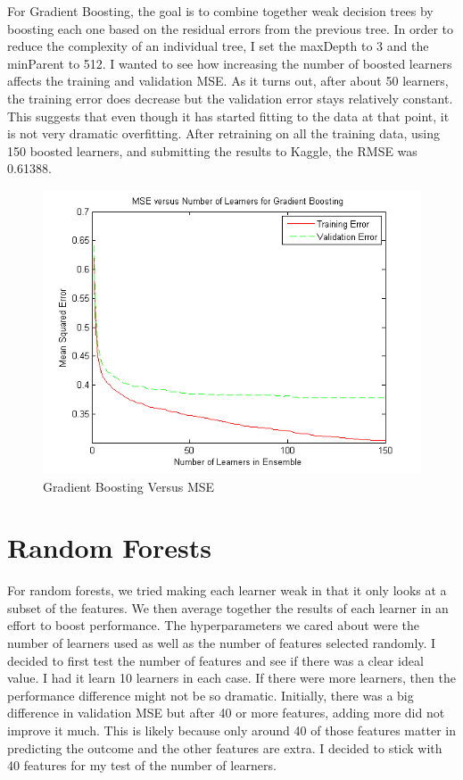\documentclass[twoside,11pt]{article}
\theoremstyle{definition}
\begin{document}
For Gradient Boosting, the goal is to combine together weak decision trees by boosting each one based on the residual errors from the previous tree. In order to reduce the complexity of an individual tree, I set the maxDepth to 3 and the minParent to 512. I wanted to see how increasing the number of boosted learners affects the training and validation MSE. As it turns out, after about 50 learners, the training error does decrease but the validation error stays relatively constant. This suggests that even though it has started fitting to the data at that point, it is not very dramatic overfitting. After retraining on all the training data, using 150 boosted learners, and submitting the results to Kaggle, the RMSE was 0.61388. \\
\begin{figure}[h!]
\centering
\includegraphics[width=4 in]{numGradBoostsVersusMSE.png}
\caption{Gradient Boosting Versus MSE}
\end{figure}

\newpage

\section*{Random Forests}

For random forests, we tried making each learner weak in that it only looks at a subset of the features. We then average together the results of each learner in an effort to boost performance. The hyperparameters we cared about were the number of learners used as well as the number of features selected randomly. I decided to first test the number of features and see if there was a clear ideal value. I had it learn 10 learners in each case. If there were more learners, then the performance difference might not be so dramatic. Initially, there was a big difference in validation MSE but after 40 or more features, adding more did not improve it much. This is likely because only around 40 of those features matter in predicting the outcome and the other features are extra. I decided to stick with 40 features for my test of the number of learners. \\
\end{document}
